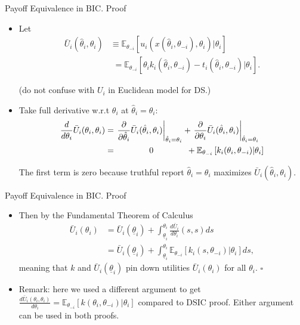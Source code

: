 \documentclass[english,10pt
,aspectratio=169
]{beamer}
\begin{document}
\begin{frame}{Payoff Equivalence in BIC. Proof}
	\begin{itemize}
		\item Let 
		\vspace{-0.5em}\begin{align*}
		\bar{U}_i (\hat{\theta}_i,\theta_i) &\equiv \mathbb{E}_{\theta_{-i}} \left[ u_i \left( x(\hat{\theta}_i, \theta_{-i}), \theta_i \right) | \theta_i \right]
		\\
		&\,\,= \mathbb{E}_{\theta_{-i}} \left[ \theta_i k_i(\hat{\theta}_i, \theta_{-i}) - t_i \left( \hat{\theta}_i, \theta_{-i} \right) | \theta_i \right].
		\end{align*}\vspace{-1em}
		
		(do not confuse with $U_i$ in Euclidean model for DS.)
		\pause
		\item Take full derivative w.r.t $\theta_i$ at $\hat{\theta}_i=\theta_i$:
		\vspace{-0.5em}\begin{align*}
		\frac{d}{d \theta_i} \bar{U}_i (\theta_i,\theta_i) &= \left. \frac{\partial}{\partial \hat{\theta}_i} \bar{U}_i (\hat{\theta}_i,\theta_i) \right|_{\hat{\theta}_i=\theta_i} + \left. \frac{\partial}{\partial \theta_i} \bar{U}_i (\hat{\theta}_i,\theta_i) \right|_{\hat{\theta}_i=\theta_i}
		\\ &= \hspace{1.4cm} 0 \hspace{1.4cm} + \mathbb{E}_{\theta_{-i}} \left[k_i (\theta_i, \theta_{-i}) | \theta_i \right]
		\end{align*}\vspace{-1em}
		
		The first term is zero because truthful report $\hat{\theta}_i = \theta_i$ maximizes $\bar{U}_i (\hat{\theta}_i,\theta_i)$.
	\end{itemize}
\end{frame}


\begin{frame}{Payoff Equivalence in BIC. Proof}
	\begin{itemize}
		\item Then by the Fundamental Theorem of Calculus
		\begin{align*}
		\bar{U}_i (\theta_i) &= \bar{U}_i (\underline{\theta}_i) + \int_{\underline{\theta}_i}^{\theta_i} \frac{d \bar{U}_i}{d \theta_i}(s,s) d s
		\\&= \bar{U}_i (\underline{\theta}_i) + \int_{\underline{\theta}_i}^{\theta_i} \mathbb{E}_{\theta_{-i}} \left[k_i(s,\theta_{-i}) | \theta_i \right] d s,
		\end{align*}
		meaning that $k$ and $\bar{U}_i (\underline{\theta}_i)$ pin down utilities $\bar{U}_i (\theta_i)$ for all $\theta_i$. $\square$
		\medskip
		\item Remark: here we used a different argument to get $\frac{d \bar{U}_i (\theta_i,\theta_{i})}{d \theta_i} = \mathbb{E}_{\theta_{-i}} \left[k(\theta_i,\theta_{-i}) | \theta_i \right]$ compared to DSIC proof. Either argument can be used in both proofs.
	\end{itemize}
\end{frame}
\end{document}
